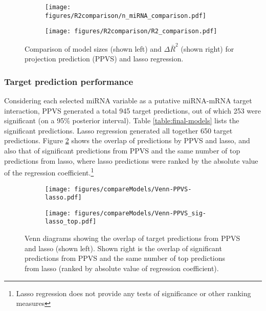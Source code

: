 \begin{figure}[!h]
  \centering
  \begin{subfigure}{.45\textwidth}
    \texttt{[image: figures/R2comparison/n\_miRNA\_comparison.pdf]}
  \end{subfigure}
  \begin{subfigure}{.45\textwidth}
    \texttt{[image: figures/R2comparison/R2\_comparison.pdf]}
  \end{subfigure}

  \caption{Comparison of model sizes (shown left) and $\Delta\bar{R}^2$ (shown right) for
      projection prediction (PPVS) and lasso regression.}
  \label{fig:model-size}
\end{figure}




\subsubsection*{Target prediction performance}

Considering each selected miRNA variable as a putative miRNA-mRNA target
interaction, PPVS generated a total 945 target predictions, out of which
253 were significant (on a 95\% posterior interval). Table \ref{table:final-models}
lists the significant predictions.
Lasso regression generated all together 650 target predictions. Figure
\ref{fig:venn} shows the overlap of predictions by PPVS and lasso, and also
that of significant predictions from PPVS and the same number of top
predictions from lasso, where lasso predictions were ranked by the absolute value of
the regression coefficient.\footnote{Lasso regression does not provide any tests of
significance or other ranking measures}

\begin{figure}[!h]
  \centering
  \begin{subfigure}{.45\textwidth}
    \centering
    \texttt{[image: figures/compareModels/Venn-PPVS-lasso.pdf]}
  \end{subfigure}
  \begin{subfigure}{.45\textwidth}
    \centering
    \texttt{[image: figures/compareModels/Venn-PPVS\_sig-lasso\_top.pdf]}
  \end{subfigure}

  \caption{Venn diagrams showing the overlap of target predictions from PPVS
  and lasso (shown left). Shown right is the overlap of significant predictions
  from PPVS and the same number of top predictions from lasso (ranked by
  absolute value of regression coefficient).}
  \label{fig:venn}
\end{figure}

